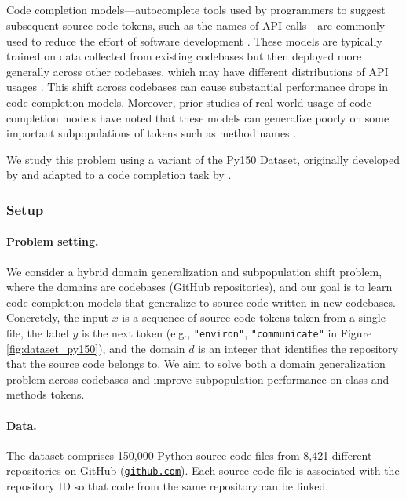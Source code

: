 \subsection{\Py}\label{sec:app_py150}

Code completion models---autocomplete tools used by programmers to suggest subsequent source code tokens, such as the names of API calls---are commonly used to reduce the effort of software development \citep{robbes2008program,bruch2009learning,nguyen2015graph,proksch2015intelligent,franks2015cacheca}.
These models are typically trained on data collected from existing codebases but then deployed more generally across other codebases, which may have different distributions of API usages \citep{nita2010using,proksch2016evaluating,allamanis2017smartpaste}. This shift across codebases can cause substantial performance drops in code completion models.
Moreover, prior studies of real-world usage of code completion models have noted that these models can generalize poorly on some important subpopulations of tokens such as method names \citep{hellendoorn2019code}.

We study this problem using a variant of the Py150 Dataset, originally developed by \citet{raychev2016probabilistic} and adapted to a code completion task by \citet{CodeXGLUE}.

\subsubsection{Setup}
\paragraph{Problem setting.}
We consider a hybrid domain generalization and subpopulation shift problem, where the domains are codebases (GitHub repositories), and our goal is to learn code completion models that generalize to source code written in new codebases.
Concretely, the input $x$ is a sequence of source code tokens taken from a single file, the label $y$ is the next token (e.g., \texttt{"environ"}, \texttt{"communicate"} in Figure \ref{fig:dataset_py150}), and the domain $d$ is an integer that identifies the repository that the source code belongs to.
We aim to solve both a domain generalization problem across codebases and improve subpopulation performance on class and methods tokens.

\paragraph{Data.}
The dataset comprises 150,000 Python source code files from 8,421 different repositories on GitHub (\href{https://github.com/}{\texttt{github.com}}).  Each source code file is associated with the repository ID so that code from the same repository can be linked.


